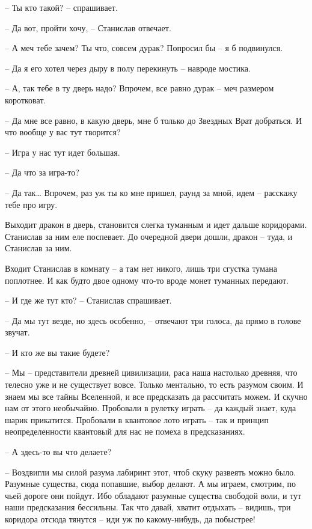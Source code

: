 \documentclass[ebook,oneside,final,openright]{memoir}
\begin{document}
\par
– Ты кто такой? – спрашивает.\par
– Да вот, пройти хочу, – Станислав отвечает.\par
– А меч тебе зачем? Ты что, совсем дурак? Попросил бы – я б подвинулся.\par
– Да я его хотел через дыру в полу перекинуть – навроде мостика.\par
– А, так тебе в ту дверь надо? Впрочем, все равно дурак – меч размером коротковат.\par
– Да мне все равно, в какую дверь, мне б только до Звездных Врат добраться. И что вообще у вас тут творится?\par
– Игра у нас тут идет большая.\par
– Да что за игра-то?\par
– Да так… Впрочем, раз уж ты ко мне пришел, раунд за мной, идем – расскажу тебе про игру.\par
\par
Выходит дракон в дверь, становится слегка туманным и идет дальше коридорами. Станислав за ним еле поспевает. До очередной двери дошли, дракон – туда, и Станислав за ним. \par
Входит Станислав в комнату – а там нет никого, лишь три сгустка тумана поплотнее. И как будто двое одному что-то вроде монет туманных передают.\par
– И где же тут кто? – Станислав спрашивает.\par
– Да мы тут везде, но здесь особенно, – отвечают три голоса, да прямо в голове звучат.\par
– И кто же вы такие будете?\par
– Мы – представители древней цивилизации, раса наша настолько древняя, что телесно уже и не существует вовсе. Только ментально, то есть разумом своим. И знаем мы все тайны Вселенной, и все предсказать да рассчитать можем. И скучно нам от этого необычайно. Пробовали в рулетку играть – да каждый знает, куда шарик прикатится. Пробовали в квантовое лото играть – так и принцип неопределенности квантовый для нас не помеха в предсказаниях.\par
– А здесь-то вы что делаете?\par
– Воздвигли мы силой разума лабиринт этот, чтоб скуку развеять можно было. Разумные существа, сюда попавшие, выбор делают. А мы играем, смотрим, по чьей дороге они пойдут. Ибо обладают разумные существа свободой воли, и тут наши предсказания бессильны. Так что давай, хватит отдыхать – видишь, три коридора отсюда тянутся – иди уж по какому-нибудь, да побыстрее!\par
\end{document}
